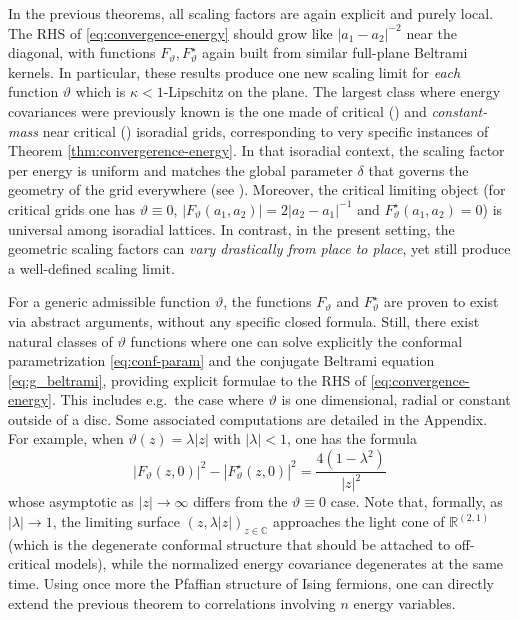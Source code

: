 \documentclass[reqno]{amsart}
\numberwithin{equation}{section}
\theoremstyle{definition}
\theoremstyle{remark}
\begin{document}
In the previous theorems, all scaling factors are again explicit and purely local. The RHS of \eqref{eq:convergence-energy} should grow like $|a_1-a_2|^{-2}$ near the diagonal, with functions $F_{\vartheta},F^\star_{\vartheta}$ again built from similar full-plane Beltrami kernels. In particular, these results produce one new scaling limit for  \emph{each} function $\vartheta$ which is $\kappa<1$-Lipschitz on the plane. The largest class where energy covariances were previously known is the one made of critical (\cite{HonPHD,CHI-mixed}) and \emph{constant-mass} near critical (\cite{WanPHD}) isoradial grids, corresponding to very specific instances of Theorem \ref{thm:convergerence-energy}. In that isoradial context, the scaling factor per energy is uniform and matches the global parameter $\delta$ that governs the geometry of the grid everywhere (see \cite[Theorem 4.4]{CheECM}). Moreover, the critical limiting object (for critical grids one has $\vartheta \equiv 0$, $|F_{\vartheta}(a_1,a_2)|=2|a_2-a_1|^{-1}$ and $F^\star_{\vartheta}(a_1,a_2)=0$) is universal among isoradial lattices. In contrast, in the present setting, the geometric scaling factors can \emph{vary drastically from place to place}, yet still produce a well-defined scaling limit. 

For a generic admissible function $\vartheta$, the functions $F_{\vartheta}$ and $F^\star_{\vartheta}$ are proven to exist via abstract arguments, without any specific closed formula. Still, there exist natural classes of $\vartheta$ functions where one can solve explicitly the conformal parametrization \eqref{eq:conf-param} and the conjugate Beltrami equation \eqref{eq:g_beltrami}, providing explicit formulae to the RHS of \eqref{eq:convergence-energy}. This includes e.g.\ the case where $\vartheta$ is one dimensional, radial or constant outside of a disc. Some associated computations are detailed in the Appendix. For example, when $\vartheta(z)=\lambda |z|$ with $|\lambda|<1$, one has the formula
\begin{equation*}
	|F_\vartheta(z,0)|^2-|F^\star_\vartheta(z,0)|^2
        =\frac{4 (1-\lambda^2)}{|z|^2}
\end{equation*}
whose asymptotic as $|z| \to \infty $ differs from the $\vartheta \equiv 0 $ case. Note that, formally, as $|\lambda| \to 1$, the limiting surface $(z,\lambda |z|)_{z\in \mathbb{C}}$ approaches the light cone of $\mathbb{R}^{(2,1)}$ (which is the degenerate conformal structure that should be attached to off-critical models), while the normalized energy  covariance degenerates at the same time. Using once more the Pfaffian structure of Ising fermions, one can directly extend the previous theorem to correlations involving $n$ energy variables.
\end{document}
